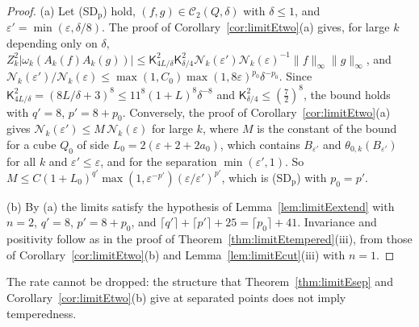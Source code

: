 \documentclass[aps,prd,twocolumn,superscriptaddress,nofootinbib,longbibliography,floatfix,amsmath,amssymb,10pt]{revtex4-2}
\theoremstyle{definition}
\theoremstyle{remark}
\begin{document}
\begin{proof}
(a) Let (SD$_{\mathrm p}$) hold, $(f,g)\in\mathcal C_2(Q,\delta)$ with
$\delta\le1$, and $\varepsilon'=\min(\varepsilon,\delta/8)$. The proof of
Corollary~\ref{cor:limitEtwo}(a) gives, for large $k$ depending only on
$\delta$, $Z_k^2|\omega_k(A_k(f)A_k(g))|\le\mathsf K_{4L/\delta}^2\mathsf
K_{\delta/4}^2\mathcal N_k(\varepsilon')\mathcal N_k(\varepsilon)^{-1}\|f\|
_\infty\|g\|_\infty$, and $\mathcal N_k(\varepsilon')/\mathcal N_k(\varepsilon)
\le\max(1,C_0)\max(1,8\varepsilon)^{p_0}\delta^{-p_0}$. Since $\mathsf
K_{4L/\delta}^2=(8L/\delta+3)^8\le11^8(1+L)^8\delta^{-8}$ and $\mathsf
K_{\delta/4}^2\le(\frac72)^8$, the bound holds with $q'=8$, $p'=8+p_0$.
Conversely, the proof of Corollary~\ref{cor:limitEtwo}(a) gives $\mathcal
N_k(\varepsilon')\le M\,\mathcal N_k(\varepsilon)$ for large $k$, where $M$
is the constant of the bound for a cube $Q_0$ of side $L_0=2(\varepsilon+2+
2a_0)$, which contains $B_{\varepsilon'}$ and $\theta_{0,k}(B_{\varepsilon'})$
for all $k$ and $\varepsilon'\le\varepsilon$, and for the separation
$\min(\varepsilon',1)$. So $M\le C(1+L_0)^{q'}\max(1,\varepsilon^{-p'})
(\varepsilon/\varepsilon')^{p'}$, which is (SD$_{\mathrm p}$) with $p_0=p'$.

(b) By (a) the limits satisfy the hypothesis of
Lemma~\ref{lem:limitEextend} with $n=2$, $q'=8$, $p'=8+p_0$, and $\lceil q'
\rceil+\lceil p'\rceil+25=\lceil p_0\rceil+41$. Invariance and positivity
follow as in the proof of Theorem~\ref{thm:limitEtempered}(iii), from those of
Corollary~\ref{cor:limitEtwo}(b) and Lemma~\ref{lem:limitEcut}(iii) with
$n=1$.
\end{proof}

The rate cannot be dropped: the structure that Theorem~\ref{thm:limitEsep}
and Corollary~\ref{cor:limitEtwo}(b) give at separated points does not imply
temperedness.
\end{document}
